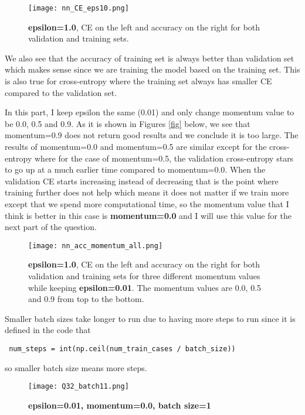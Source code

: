 \documentclass[10pt]{article}
\begin{document}
\begin{figure}[H]
	\centering
	\texttt{[image: nn\_CE\_eps10.png]}
	\caption{\textbf{epsilon=1.0}, CE on the left and accuracy on the right for both validation and training sets.}
	\label{fig:refer2}
\end{figure}

We also see that the accuracy of training set is always better than validation set which makes sense since we are training the model based on the training set.
This is also true for cross-entropy where the training set always has smaller CE compared to the validation set.


In this part, I keep epsilon the same (0.01) and only change momentum value to be 0.0, 0.5 and 0.9. As it is shown in Figures \ref{fig} below, we see that momentum=0.9 does not return good results and we conclude it is too large. The results of momentum=0.0 and momentum=0.5 are similar except for the cross-entropy where for the case of momentum=0.5, the validation cross-entropy stars to go up at a much earlier time compared to momentum=0.0. When the validation CE starts increasing instead of decreasing that is the point where training further does not help which means it does not matter if we train more except that we spend more computational time, so the momentum value that I think is better in this case is \textbf{momentum=0.0} and I will use this value for the next part of the question.

\begin{figure}[H]
	\centering
	\texttt{[image: nn\_acc\_momentum\_all.png]}
	\caption{\textbf{epsilon=1.0}, CE on the left and accuracy on the right for both validation and training sets for three different momentum values while keeping \textbf{epsilon=0.01}. The momentum values 	are 0.0, 0.5 and 0.9 from top to the bottom.}
	\label{fig:refer2}
\end{figure}

Smaller batch sizes take longer to run due to having more steps to run since it is defined in the code that \begin{verbatim} num_steps = int(np.ceil(num_train_cases / batch_size)) \end{verbatim} so smaller batch size means more steps.

\begin{figure}[H]
	\centering
	\texttt{[image: Q32\_batch11.png]}
	\caption{\textbf{epsilon=0.01, momentum=0.0, batch size=1}}
	\label{fig:Q32_batch10}
\end{figure}
\end{document}
